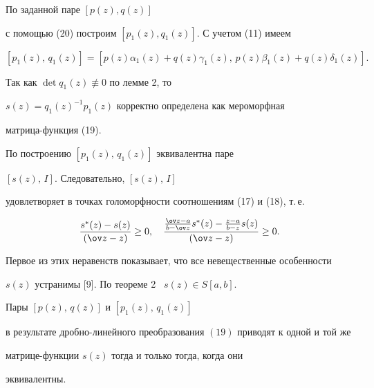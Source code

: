 \begin{pf}


По заданной паре $[p(z),q(z)]$


с помощью (20) построим $[p_1(z),q_1(z)]$. С учетом (11) имеем


$$


[p_1(z),\, q_1(z)]=[p(z)\alpha_1(z)+q(z)\gamma_1(z), \, p(z)


\beta_1(z)+q(z)\delta_1(z)].


$$


Так как $\det q_1(z) \not \equiv 0$ по лемме 2, то


$s(z)=q_1(z)^{-1}p_1(z)$ корректно определена как мероморфная


матрица-функция (19).


По построению $[ p_1(z),\, q_1(z)]$ эквивалентна паре


$[ s(z),\, I]$. Следовательно, $[ s(z),\, I]$


удовлетворяет в точках голоморфности соотношениям (17) и (18), т.\,е.


$$


\frac{s^*(z)-s(z)}{(\ov z-z)} \geq 0, \quad


\frac{ \frac{\ov z -a}{b-\ov z}


s^*(z)-\frac{z-a}{b-z}s(z)}{(\ov z-z)}\geq 0.


$$


Первое из этих неравенств показывает, что все невещественные особенности


$s(z)$ устранимы [9]. По теореме 2 \ $s(z) \in S[a,b]$.


\end{pf}





\begin{lem}


Пары $ [p(z),\, q(z) ]$ и $[p_1(z), \, q_1(z)]$


в результате дробно-линейного преобразования $(19)$ приводят к одной и той же


матрице-функции $s(z)$ тогда и только тогда, когда они


эквивалентны.


\end{lem}





